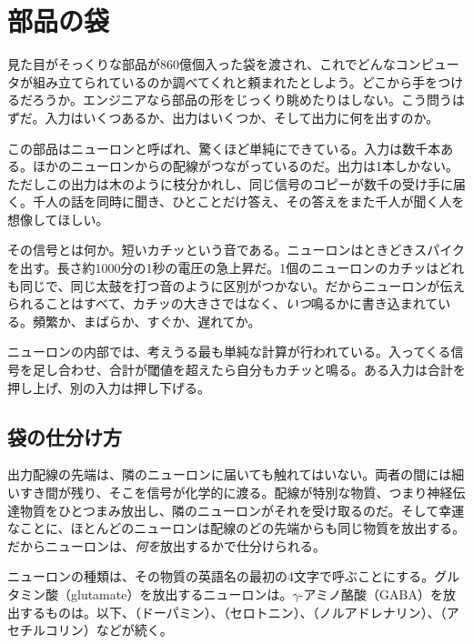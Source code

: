 \chapter{部品の袋}


見た目がそっくりな部品が860億個入った袋を渡され、これでどんなコンピュータが組み立てられているのか調べてくれと頼まれたとしよう。どこから手をつけるだろうか。エンジニアなら部品の形をじっくり眺めたりはしない。こう問うはずだ。入力はいくつあるか、出力はいくつか、そして出力に何を出すのか。

この部品はニューロンと呼ばれ、驚くほど単純にできている。入力は数千本ある。ほかのニューロンからの配線がつながっているのだ。出力は1本しかない。ただしこの出力は木のように枝分かれし、同じ信号のコピーが数千の受け手に届く。千人の話を同時に聞き、ひとことだけ答え、その答えをまた千人が聞く人を想像してほしい。

その信号とは何か。短いカチッという音である。ニューロンはときどきスパイクを出す。長さ約1000分の1秒の電圧の急上昇だ。1個のニューロンのカチッはどれも同じで、同じ太鼓を打つ音のように区別がつかない。だからニューロンが伝えられることはすべて、カチッの大きさではなく、\emph{いつ}鳴るかに書き込まれている。頻繁か、まばらか、すぐか、遅れてか。

ニューロンの内部では、考えうる最も単純な計算が行われている。入ってくる信号を足し合わせ、合計が閾値を超えたら自分もカチッと鳴る。ある入力は合計を押し上げ、別の入力は押し下げる。

\section*{袋の仕分け方}

出力配線の先端は、隣のニューロンに届いても触れてはいない。両者の間には細いすき間が残り、そこを信号が化学的に渡る。配線が特別な物質、つまり神経伝達物質をひとつまみ放出し、隣のニューロンがそれを受け取るのだ。そして幸運なことに、ほとんどのニューロンは配線のどの先端からも同じ物質を放出する。だからニューロンは、\emph{何を}放出するかで仕分けられる。

ニューロンの種類は、その物質の英語名の最初の4文字で呼ぶことにする。グルタミン酸（glutamate）を放出するニューロンは。$\gamma$-アミノ酪酸（GABA）を放出するものは。以下、（ドーパミン）、（セロトニン）、（ノルアドレナリン）、（アセチルコリン）などが続く。


